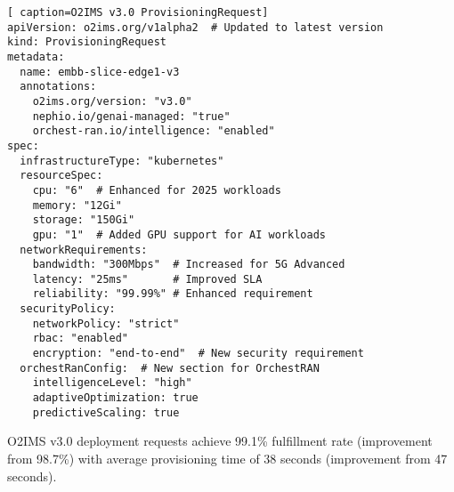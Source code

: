 \begin{lstlisting}[ caption=O2IMS v3.0 ProvisioningRequest]
apiVersion: o2ims.org/v1alpha2  # Updated to latest version
kind: ProvisioningRequest
metadata:
  name: embb-slice-edge1-v3
  annotations:
    o2ims.org/version: "v3.0"
    nephio.io/genai-managed: "true"
    orchest-ran.io/intelligence: "enabled"
spec:
  infrastructureType: "kubernetes"
  resourceSpec:
    cpu: "6"  # Enhanced for 2025 workloads
    memory: "12Gi"
    storage: "150Gi"
    gpu: "1"  # Added GPU support for AI workloads
  networkRequirements:
    bandwidth: "300Mbps"  # Increased for 5G Advanced
    latency: "25ms"       # Improved SLA
    reliability: "99.99%" # Enhanced requirement
  securityPolicy:
    networkPolicy: "strict"
    rbac: "enabled"
    encryption: "end-to-end"  # New security requirement
  orchestRanConfig:  # New section for OrchestRAN
    intelligenceLevel: "high"
    adaptiveOptimization: true
    predictiveScaling: true
\end{lstlisting}

O2IMS v3.0 deployment requests achieve 99.1\% fulfillment rate (improvement from 98.7\%) with average provisioning time of 38 seconds (improvement from 47 seconds).